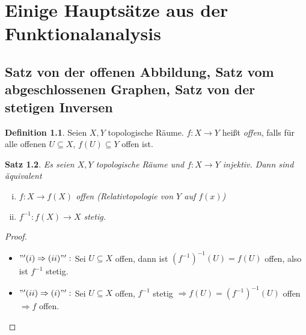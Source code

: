 \documentclass[ngerman]{report}
\theoremstyle{plain}%
\newtheorem{thm}{Satz}[chapter]
\theoremstyle{definition}%
\newtheorem{definition}[thm]{Definition}
\theoremstyle{myStyle}
\newcommand{\df}[1][]{%
	\overset{#1}{\Rightarrow}
}
\newcommand{\inv}[1]{#1^{-1}}
\begin{document}

\chapter{Einige Hauptsätze aus der Funktionalanalysis}			

	
\section{Satz von der offenen Abbildung, Satz vom abgeschlossenen Graphen, Satz von der stetigen Inversen}

	\begin{definition}
		Seien $X,Y$ topologische Räume. $f: X\to Y$ heißt \textit{offen}, falls für alle offenen $U\subseteq X$, $f(U)\subseteq Y$ offen ist.
	\end{definition}

	\begin{thm}
		Es seien $X,Y$ topologische Räume und $f: X\to Y$ injektiv. Dann sind äquivalent
		\begin{enumerate}[(i)]
			\item $f: X \to f(X)$ offen (Relativtopologie von $Y$ auf $f(x)$)	
			\item $\inv{f}: f(X) \to X$ stetig.
		\end{enumerate}
	\end{thm}

	\begin{proof}
		\begin{itemize}[]
			\item $"'(i) \df (ii)"':$ Sei $U \subseteq X$ offen, dann ist $ \inv{(\inv{f})}(U) = f(U)$ offen, also ist $\inv{f}$ stetig.
		\item $"'(ii) \df (i)"':$ Sei $U \subseteq X$ offen, $\inv{f}$ stetig 
			$\df f(U) = \inv{(\inv{f})}(U)$ offen $\df f $ offen.
		\end{itemize}
	\end{proof}
\end{document}
